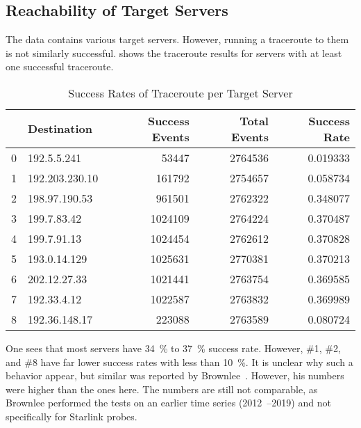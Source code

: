 
\subsection{Reachability of Target Servers}

The data contains various target servers. However, running a traceroute to them
is not similarly successful.  shows the
traceroute results for servers with at least one successful traceroute.

\begin{table}
	\footnotesize
	\caption{Success Rates of Traceroute per Target Server}
	\label{fig:traceroute-success-rates}
	\begin{tabular}{llrrr}
		\toprule
		  & Destination    & Success Events & Total Events & Success Rate \\
		\midrule
		0 & 192.5.5.241    & 53447          & 2764536      & 0.019333     \\
		1 & 192.203.230.10 & 161792         & 2754657      & 0.058734     \\
		2 & 198.97.190.53  & 961501         & 2762322      & 0.348077     \\
		3 & 199.7.83.42    & 1024109        & 2764224      & 0.370487     \\
		4 & 199.7.91.13    & 1024454        & 2762612      & 0.370828     \\
		5 & 193.0.14.129   & 1025631        & 2770381      & 0.370213     \\
		6 & 202.12.27.33   & 1021441        & 2763754      & 0.369585     \\
		7 & 192.33.4.12    & 1022587        & 2763832      & 0.369989     \\
		8 & 192.36.148.17  & 223088         & 2763589      & 0.080724     \\
		\bottomrule
	\end{tabular}
\end{table}

One sees that most servers have 34~\% to 37~\% success rate. However, \#1, \#2,
and \#8 have far lower success rates with less than 10~\%. It is unclear why
such a behavior appear, but similar was reported by
Brownlee~\cite{Brownlee2021}. However, his numbers were higher than the ones
here. The numbers are still not comparable, as Brownlee performed the tests on
an earlier time series (2012~--2019) and not specifically for Starlink probes.

